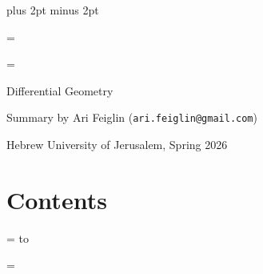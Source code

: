 




\parindent=0pt
\parskip=3pt plus 2pt minus 2pt



\footline={}


\headline={\pagedecor}

{\setboxshadow
\contentbox

    \centerline{Differential Geometry}
    \smallskip
    \centerline{Summary by Ari Feiglin ({\tt ari.feiglin@gmail.com})}
    \centerline{Hebrew University of Jerusalem, Spring 2026}

\eppbox

\bigskip

\contentbox
    \section*{Contents}
    
    \tableofcontents
\eppbox

}

\vfill\break

\color{black}

\newif\ifpageodd
\pageoddtrue
\headline={%
    \hbox to \hsize{\color{black}%
        \ifpageodd\hfil{\it\currsubsection\quad\bf\folio}\global\pageoddfalse%
        \else{\bf\folio\quad\it\currsubsection}\hfil\global\pageoddtrue\fi%
    }%
}





















\unless\iftesttime

\vfill\break

\headline={\pagedecor}

\null\vfill

